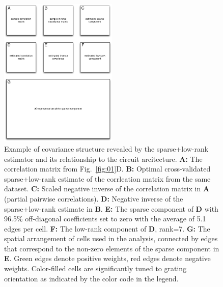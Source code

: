 \begin{figure}[htp]
\centering
\includegraphics[width=0.5\textwidth]{figures/Figure5.pdf}
\caption{
Example of covariance structure revealed by the sparse+low-rank estimator and its relationship to the circuit arcitecture.
{\bf A:} The correlation matrix from Fig.~\ref{fig:01}D. 
{\bf B:} Optimal cross-validated sparse+low-rank estimate of the corrleation matrix from the same dataset. 
{\bf C:} Scaled negative inverse of the correlation matrix in {\bf A} (partial pairwise correlations). 
{\bf D:} Negative inverse of the sparse+low-rank estimate in {\bf B}. 
{\bf E:} The sparse component of {\bf D} with 96.5\% off-diagonal coefficients set to zero with the average of 5.1 edges per cell.
{\bf F:} The low-rank component of {\bf D}, rank=7.
{\bf G:} The spatial arrangement of cells used in the analysis, connected by edges that correspond to the non-zero elements of the sparse component in {\bf E}. Green edges denote positive weights, red edges denote negative weights.  Color-filled cells are significantly tuned to grating orientation as indicated by the color code in the legend.
}
\label{fig:05}
\end{figure}
